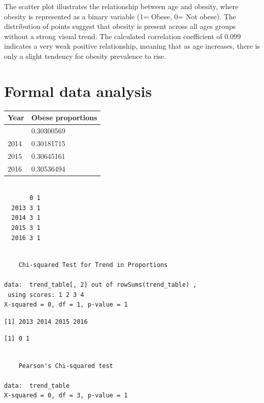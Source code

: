 \documentclass[
  letterpaper,
  DIV=11,
  numbers=noendperiod]{scrartcl}
\begin{document}
The scatter plot illustrates the relationship between age and obesity,
where obesity is represented as a binary variable (1= Obese, 0= Not
obese). The distribution of points suggest that obesity is present
across all ages groups without a strong visual trend. The calculated
correlation coefficient of 0.099 indicates a very weak positive
relationship, meaning that as age increases, there is only a slight
tendency for obesity prevalence to rise.

\section{Formal data analysis}\label{sec-formdata}

\begin{longtable}[]{@{}ll@{}}
\toprule\noalign{}
Year & Obese proportions \\
\midrule\noalign{}
\endhead
\bottomrule\noalign{}
\endlastfoot
2013 & 0.30300569 \\
2014 & 0.30181715 \\
2015 & 0.30645161 \\
2016 & 0.30536494 \\
\end{longtable}

\begin{verbatim}
      
       0 1
  2013 3 1
  2014 3 1
  2015 3 1
  2016 3 1
\end{verbatim}

\begin{verbatim}

    Chi-squared Test for Trend in Proportions

data:  trend_table[, 2] out of rowSums(trend_table) ,
 using scores: 1 2 3 4
X-squared = 0, df = 1, p-value = 1
\end{verbatim}

\begin{verbatim}
[1] 2013 2014 2015 2016
\end{verbatim}

\begin{verbatim}
[1] 0 1
\end{verbatim}

\begin{verbatim}

    Pearson's Chi-squared test

data:  trend_table
X-squared = 0, df = 3, p-value = 1
\end{verbatim}
\end{document}
